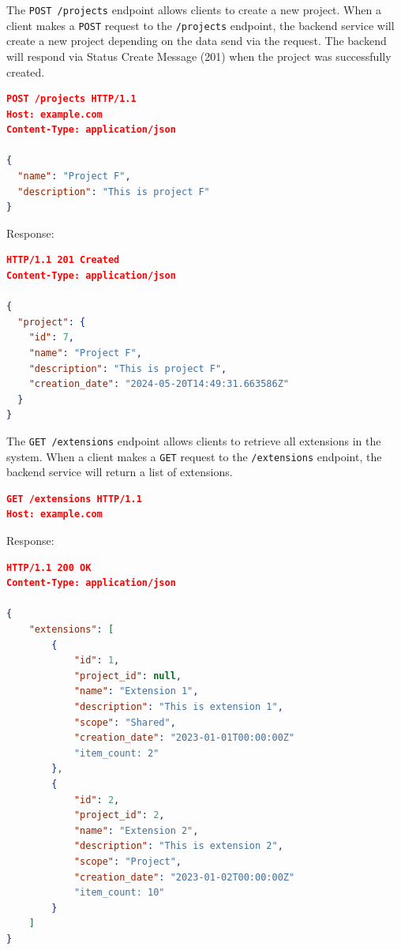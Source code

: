 
The \texttt{POST /projects} endpoint allows clients to create a new project.
When a client makes a \texttt{POST} request to the \texttt{/projects} endpoint, the backend service will create a new project depending on the data send via the request.
The backend will respond via Status Create Message (201) when the project was successfully created.

\begin{lstlisting}[language=json,label={lst:lstlisting31}]
POST /projects HTTP/1.1
Host: example.com
Content-Type: application/json

{
  "name": "Project F",
  "description": "This is project F"
}
\end{lstlisting}

Response:

\begin{lstlisting}[language=json,label={lst:lstlisting32}]
HTTP/1.1 201 Created
Content-Type: application/json

{
  "project": {
    "id": 7,
    "name": "Project F",
    "description": "This is project F",
    "creation_date": "2024-05-20T14:49:31.663586Z"
  }
}
\end{lstlisting}


The \texttt{GET /extensions} endpoint allows clients to retrieve all extensions in the system.
When a client makes a \texttt{GET} request to the \texttt{/extensions} endpoint, the backend service will return a list of extensions.

\begin{lstlisting}[language=json,label={lst:lstlisting13}]
GET /extensions HTTP/1.1
Host: example.com
\end{lstlisting}

Response:

\begin{lstlisting}[language=json,label={lst:lstlisting23}]
HTTP/1.1 200 OK
Content-Type: application/json

{
    "extensions": [
        {
            "id": 1,
            "project_id": null,
            "name": "Extension 1",
            "description": "This is extension 1",
            "scope": "Shared",
            "creation_date": "2023-01-01T00:00:00Z"
            "item_count: 2"
        },
        {
            "id": 2,
            "project_id": 2,
            "name": "Extension 2",
            "description": "This is extension 2",
            "scope": "Project",
            "creation_date": "2023-01-02T00:00:00Z"
            "item_count: 10"
        }
    ]
}
\end{lstlisting}


